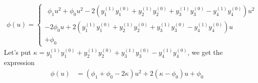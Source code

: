 \begin{align}
\phi(u)= \left\{\begin{array}{l} \ \ 
\phi_1u^2+\phi_0u^2-2\left(y_1^{(1)}y_1^{(0)}+y_2^{(1)}y_2^{(0)}+y_3^{(1)}y_3^{(0)}-y_4^{(1)}y_4^{(0)}\right)u^2 \\
-2\phi_0 u + 2 \left(y_1^{(1)}y_1^{(0)}+y_2^{(1)}y_2^{(0)}+y_3^{(1)}y_3^{(0)}-y_4^{(1)}y_4^{(0)}\right)u\\
+\phi_0
\end{array}\right.
\end{align}
Let's put $\kappa = y_1^{(1)}y_1^{(0)}+y_2^{(1)}y_2^{(0)}+y_3^{(1)}y_3^{(0)}-y_4^{(1)}y_4^{(0)}$, we get the expression
\begin{align}
\phi(u)&= 
\left(\phi_1 +\phi_0-2\kappa\right) u^2 + 2 \left(\kappa- \phi_0\right)u
+\phi_0
\end{align}


